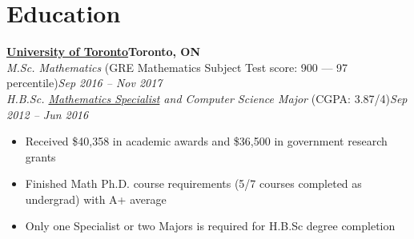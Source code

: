 \documentclass[10pt,letterpaper]{article}
\newcommand*\company[1]{\textbf{#1}}
\newcommand*\position[1]{\textit{#1}}
\newcommand*\location\company
\newcommand*\timespan\position
\begin{document}
\section*{Education}
\company{\href{https://www.utoronto.ca/}{University of Toronto}}\hfill\location{Toronto, ON}\\
\position{M.Sc. Mathematics} (GRE Mathematics Subject Test score: 900 --- 97 percentile)\hfill\timespan{Sep 2016 -- Nov 2017}
\\
\position{H.B.Sc. \href{http://calendar.artsci.utoronto.ca/crs_mat.htm\#ASSPE1165}{Mathematics Specialist} and Computer Science Major} (CGPA: 3.87/4)\hfill\timespan{Sep 2012 -- Jun 2016}
\begin{itemize}
\item Received \$40,358 in academic awards and \$36,500 in government research grants
\item Finished Math Ph.D. course requirements (5/7 courses completed as undergrad) with A+ average
\item Only one Specialist or two Majors is required for H.B.Sc degree completion
\end{itemize}
\end{document}
